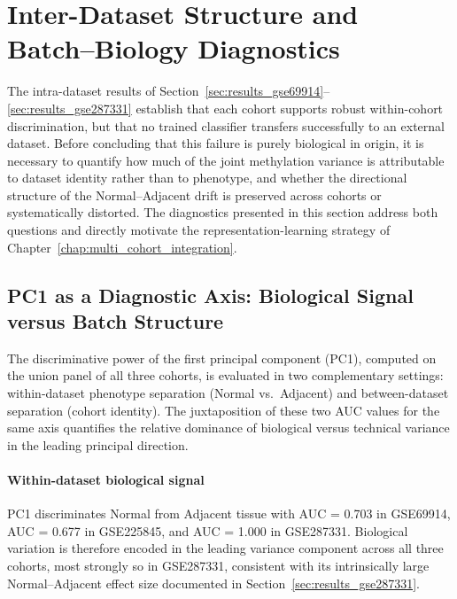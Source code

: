 \section{Inter-Dataset Structure and Batch--Biology
         Diagnostics}
\label{sec:inter_dataset}

The intra-dataset results of Section~\ref{sec:results_gse69914}--\ref{sec:results_gse287331}
establish that each cohort supports robust within-cohort
discrimination, but that no trained classifier transfers
successfully to an external dataset. Before concluding that
this failure is purely biological in origin, it is necessary
to quantify how much of the joint methylation variance is
attributable to dataset identity rather than to phenotype,
and whether the directional structure of the Normal--Adjacent
drift is preserved across cohorts or systematically distorted.
The diagnostics presented in this section address both
questions and directly motivate the representation-learning
strategy of Chapter~\ref{chap:multi_cohort_integration}.

\subsection{PC1 as a Diagnostic Axis: Biological Signal
            versus Batch Structure}
\label{sec:pc1_diagnostic}

The discriminative power of the first principal component
(PC1), computed on the union panel of all three cohorts,
is evaluated in two complementary settings: within-dataset
phenotype separation (Normal vs.\ Adjacent) and
between-dataset separation (cohort identity). The
juxtaposition of these two AUC values for the same axis
quantifies the relative dominance of biological versus
technical variance in the leading principal direction.

\paragraph{Within-dataset biological signal}

PC1 discriminates Normal from Adjacent tissue with AUC = 0.703
in GSE69914, AUC = 0.677 in GSE225845, and AUC = 1.000 in
GSE287331. Biological variation is therefore encoded in the
leading variance component across all three cohorts, most
strongly so in GSE287331, consistent with its intrinsically
large Normal--Adjacent effect size documented in
Section~\ref{sec:results_gse287331}.

